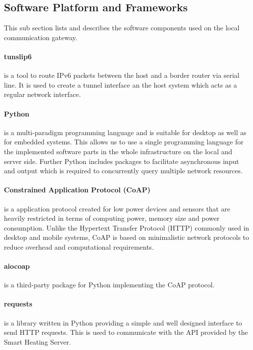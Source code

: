 \subsection{Software Platform and Frameworks}

This sub section lists and describes the software components used on the local communication gateway.

\paragraph{tunslip6} is a tool to route IPv6 packets between the host and a border router via serial line.
It is used to create a tunnel interface an the host system which acts as a regular network interface.

\paragraph{Python} is a multi-paradigm programming language and is suitable for desktop as well as for embedded systems.
This allows us to use a single programming language for the implemented software parts in the whole infrastructure on the local and server side.
Further Python includes packages to facilitate asynchronous input and output which is required to concurrently query multiple network resources.

\paragraph{Constrained Application Protocol (CoAP)} \cite{rfc7252} is a application protocol created for low power devices and sensors that are heavily restricted in terms of computing power, memory size and power consumption.
Unlike the Hypertext Transfer Protocol (HTTP) commonly used in desktop and mobile systems, CoAP is based on minimalistic network protocols to reduce overhead and computational requirements.

\paragraph{aiocoap} is a third-party package for Python implementing the CoAP protocol.

\paragraph{requests} is a library written in Python providing a simple and well designed interface to send HTTP requests.
This is used to communicate with the API provided by the Smart Heating Server.

